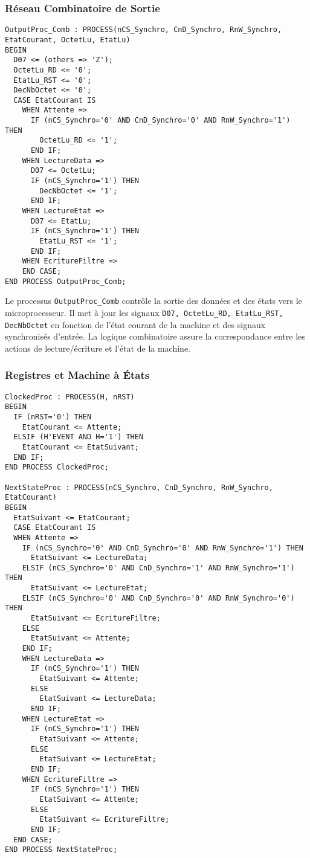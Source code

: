 \subsubsection{Réseau Combinatoire de Sortie}

\begin{lstlisting}[style=VHDLStyle, caption={Reseau Cominatoire de Sortie}]
OutputProc_Comb : PROCESS(nCS_Synchro, CnD_Synchro, RnW_Synchro, EtatCourant, OctetLu, EtatLu)
BEGIN
  D07 <= (others => 'Z');
  OctetLu_RD <= '0';
  EtatLu_RST <= '0';
  DecNbOctet <= '0';
  CASE EtatCourant IS
    WHEN Attente =>
      IF (nCS_Synchro='0' AND CnD_Synchro='0' AND RnW_Synchro='1') THEN
        OctetLu_RD <= '1';
      END IF;
    WHEN LectureData =>
      D07 <= OctetLu;
      IF (nCS_Synchro='1') THEN
        DecNbOctet <= '1';
      END IF;
    WHEN LectureEtat =>
      D07 <= EtatLu;
      IF (nCS_Synchro='1') THEN
        EtatLu_RST <= '1';
      END IF;
    WHEN EcritureFiltre =>   
    END CASE;
END PROCESS OutputProc_Comb;
\end{lstlisting}

Le processus \texttt{OutputProc\_Comb} contrôle la sortie des données et des états vers le microprocesseur. Il met à jour les signaux \texttt{D07, OctetLu\_RD, EtatLu\_RST, DecNbOctet} en fonction de l’état courant de la machine et des signaux synchronisés d’entrée. La logique combinatoire assure la correspondance entre les actions de lecture/écriture et l’état de la machine.

\subsubsection{Registres et Machine à États}

\begin{lstlisting}[style=VHDLStyle, caption={Registres}]
ClockedProc : PROCESS(H, nRST)
BEGIN
  IF (nRST='0') THEN
    EtatCourant <= Attente;
  ELSIF (H'EVENT AND H='1') THEN
    EtatCourant <= EtatSuivant;
  END IF;
END PROCESS ClockedProc;

NextStateProc : PROCESS(nCS_Synchro, CnD_Synchro, RnW_Synchro, EtatCourant)
BEGIN
  EtatSuivant <= EtatCourant;
  CASE EtatCourant IS
  WHEN Attente =>
    IF (nCS_Synchro='0' AND CnD_Synchro='0' AND RnW_Synchro='1') THEN
      EtatSuivant <= LectureData;
    ELSIF (nCS_Synchro='0' AND CnD_Synchro='1' AND RnW_Synchro='1') THEN
      EtatSuivant <= LectureEtat;
    ELSIF (nCS_Synchro='0' AND CnD_Synchro='0' AND RnW_Synchro='0') THEN
      EtatSuivant <= EcritureFiltre;
    ELSE
      EtatSuivant <= Attente;
    END IF;
    WHEN LectureData =>
      IF (nCS_Synchro='1') THEN
        EtatSuivant <= Attente;
      ELSE
        EtatSuivant <= LectureData;
      END IF;
    WHEN LectureEtat =>
      IF (nCS_Synchro='1') THEN
        EtatSuivant <= Attente;
      ELSE
        EtatSuivant <= LectureEtat;
      END IF;
    WHEN EcritureFiltre =>
      IF (nCS_Synchro='1') THEN
        EtatSuivant <= Attente;
      ELSE 
        EtatSuivant <= EcritureFiltre;
      END IF;
  END CASE;
END PROCESS NextStateProc;
\end{lstlisting}

